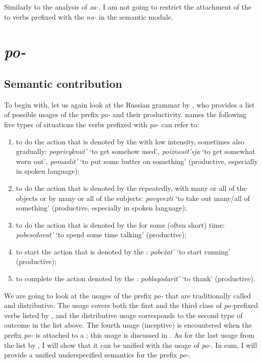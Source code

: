 Similarly to the analysis of \textit{za-}, I am not going to restrict the attachment of the  to verbs prefixed with the  \textit{na-} in the semantic module.

\section{\textit{po-}}\label{subsection:semantics:po}
\subsection{Semantic contribution} To begin with, let us again look at the Russian grammar by \citet{Shvedova:82}, who provides a list of possible usages of the prefix \textit{po-} and their productivity. \citet[364--365]{Shvedova:82} names the following five types of situations the verbs prefixed with \textit{po-} can refer to:
\begin{enumerate}
\item to do the action that is denoted by the  with low intensity, sometimes also gradually: \textit{poprivyknut'} `to get somehow used', \textit{po\-izno\-sit'sja} `to get somewhat worn out', \textit{pomaslit'} `to put some butter on something'  (productive, especially in spoken language);
\item to do the action that is denoted by the  repeatedly, with many or all of the objects or by many or all of the subjects: \textit{povyvezti} `to take out many/all of something' (productive, especially in spoken language);
\item to do the action that is denoted by the  for some (often short) time: \textit{pobesedovat'} `to spend some time talking' (productive);
\item to start the action that is denoted by the : \textit{pobe\v{z}at'} `to start running' (productive);
\item to complete the action denoted by the : \textit{poblagodarit'} `to thank' (productive).
\end{enumerate}

We are going to look at the usages of the prefix \textit{po-} that are traditionally called  and distributive. The  usage covers both the first and the third class of \textit{po-}prefixed verbs listed by \citet{Shvedova:82}, and the distributive usage corresponds to the second type of outcome in the list above. The fourth usage (inceptive) is encountered when the prefix \textit{po-} is attached to a ; this usage is discussed in \citealt{ZinovaOsswald:paper}. As for the last usage from the list by \citet{Shvedova:82}, I will show that it can be unified with the  usage of \textit{po-}. In sum, I will provide a unified underspecified semantics for the prefix \textit{po-}.


